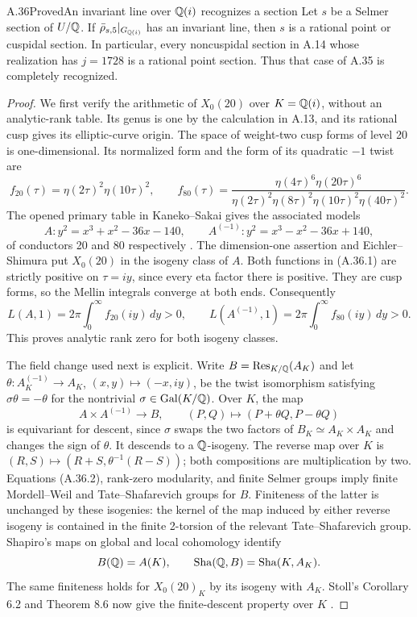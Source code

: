 \begin{statement}{A.36}{Proved}{An invariant line over $\mathbb Q(i)$ recognizes a section}
Let $s$ be a Selmer section of $U/\mathbb Q$.  If
$\bar\rho_{s,5}|_{G_{\mathbb Q(i)}}$ has an invariant line, then $s$ is a
rational point or cuspidal section.  In particular, every noncuspidal
section in A.14 whose realization has $j=1728$ is a rational point
section.  Thus that case of A.35 is completely recognized.
\end{statement}
\begin{proof}
We first verify the arithmetic of $X_0(20)$ over $K=\mathbb Q(i)$, without
an analytic-rank table.  Its genus is one by the calculation in A.13,
and its rational cusp gives its elliptic-curve origin.  The space of
weight-two cusp forms of level 20 is one-dimensional.  Its normalized
form and the form of its quadratic $-1$ twist are
\[
 f_{20}(\tau)=\eta(2\tau)^2\eta(10\tau)^2,\qquad
 f_{80}(\tau)=
 \frac{\eta(4\tau)^6\eta(20\tau)^6}
 {\eta(2\tau)^2\eta(8\tau)^2\eta(10\tau)^2\eta(40\tau)^2}.
\tag{A.36.1}
\]
The opened primary table in Kaneko--Sakai gives the associated models
\[
 A:y^2=x^3+x^2-36x-140,
 \qquad A^{(-1)}:y^2=x^3-x^2-36x+140,
\]
of conductors 20 and 80 respectively
\cite[main theorem and second table, printed p.~5]{LegKanekoSakai2013}.
The dimension-one assertion and Eichler--Shimura put $X_0(20)$ in
the isogeny class of $A$.  Both functions in (A.36.1) are strictly
positive on $\tau=iy$, since every eta factor there is positive.
They are cusp forms, so the Mellin integrals converge at both ends.
Consequently
\[
 L(A,1)=2\pi\int_0^\infty f_{20}(iy)\,dy>0,
 \qquad
 L(A^{(-1)},1)=2\pi\int_0^\infty f_{80}(iy)\,dy>0.
\tag{A.36.2}
\]
This proves analytic rank zero for both isogeny classes.

The field change used next is explicit.  Write
$B=\operatorname{Res}_{K/\mathbb Q}(A_K)$ and let
$\theta:A^{(-1)}_K\to A_K$, $(x,y)\mapsto(-x,iy)$, be the twist isomorphism satisfying
$\sigma\theta=-\theta$ for the nontrivial $\sigma\in\operatorname{Gal}(K/\mathbb Q)$.
Over $K$, the map
\[
       A\times A^{(-1)}\longrightarrow B,
       \qquad(P,Q)\longmapsto(P+\theta Q,P-\theta Q)
\tag{A.36.3}
\]
is equivariant for descent, since $\sigma$ swaps the two factors of
$B_K\simeq A_K\times A_K$ and changes the sign of $\theta$.
It descends to a $\mathbb Q$-isogeny.  The reverse map over $K$ is
$(R,S)\mapsto(R+S,\theta^{-1}(R-S))$; both compositions are
multiplication by two.  Equations (A.36.2), rank-zero modularity,
and finite Selmer groups imply finite Mordell--Weil and
Tate--Shafarevich groups for $B$.  Finiteness of the latter is
unchanged by these isogenies: the kernel of the map induced by either
reverse isogeny is contained in the finite 2-torsion of the relevant
Tate--Shafarevich group.  Shapiro's maps on global and local cohomology
identify
\[
                 B(\mathbb Q)=A(K),\qquad
                 \operatorname{Sha}(\mathbb Q,B)
                       =\operatorname{Sha}(K,A_K).
\]
The same finiteness holds for $X_0(20)_K$ by its isogeny with $A_K$.
Stoll's Corollary 6.2 and Theorem 8.6 now give the finite-descent
property over $K$ \cite{LegStoll2007,LegStollErrata2017}.


\end{proof}
